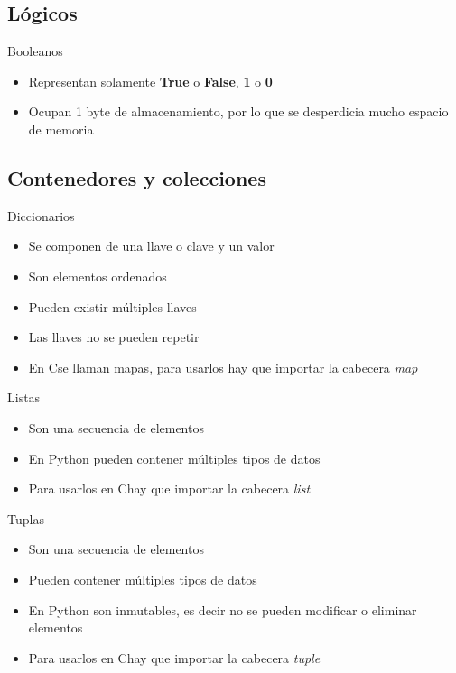 \documentclass{beamer}
\newcommand{\Rplus}{\protect\hspace{-.1em}\protect\raisebox{.35ex}{\smaller{\smaller\textbf{+}}}}
\newcommand{\Cpp}{\mbox{C\Rplus\Rplus}\hspace{3pt}}
\begin{document}
	\subsection{Lógicos}
	
	\begin{frame}{Booleanos}
		\begin{itemize}
			\item Representan solamente \textbf{True} o \textbf{False}, \textbf{1} o \textbf{0}
			\item Ocupan 1 byte de almacenamiento, por lo que se desperdicia mucho espacio de memoria
		\end{itemize}
	\end{frame}
	
	
	\subsection{Contenedores y colecciones}
	
	\begin{frame}{Diccionarios}
		\begin{itemize}
			\item Se componen de una llave o clave y un valor
			\item Son elementos ordenados
			\item Pueden existir m\'ultiples llaves
			\item Las llaves no se pueden repetir
			\item En \Cpp se llaman mapas, para usarlos hay que importar la cabecera \textit{map}
		\end{itemize}
	\end{frame}
	
	\begin{frame}{Listas}
		\begin{itemize}
			\item Son una secuencia de elementos
			\item En Python pueden contener m\'ultiples tipos de datos
			\item Para usarlos en \Cpp hay que importar la cabecera \textit{list}
		\end{itemize}
	\end{frame}
	
	\begin{frame}{Tuplas}
		\begin{itemize}
			\item Son una secuencia de elementos
			\item Pueden contener m\'ultiples tipos de datos
			\item En Python son inmutables, es decir no se pueden modificar o eliminar elementos
			\item Para usarlos en \Cpp hay que importar la cabecera \textit{tuple}
		\end{itemize}
	\end{frame}
	
\end{document}
